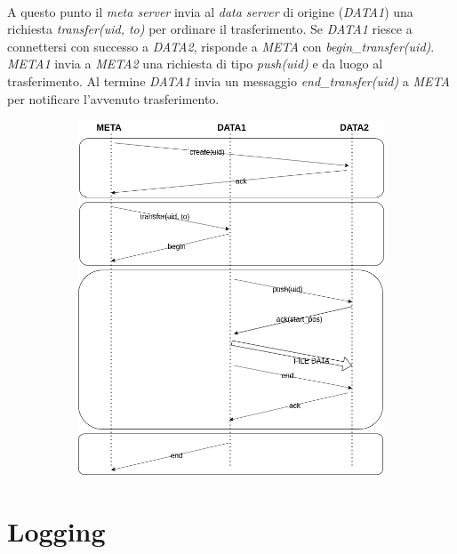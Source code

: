 \documentclass{article}
\begin{document}
\paragraph{} A questo punto il \emph{meta server} invia al \emph{data server} di origine (\emph{DATA1}) una richiesta \emph{transfer(uid, to)} per ordinare il trasferimento. Se \emph{DATA1} riesce a connettersi con successo a \emph{DATA2}, risponde a \emph{META} con \emph{begin\_transfer(uid)}. \emph{META1} invia a \emph{META2} una richiesta di tipo \emph{push(uid)} e da luogo al trasferimento. Al termine \emph{DATA1} invia un messaggio \emph{end\_transfer(uid)} a \emph{META} per notificare l'avvenuto trasferimento.


\begin{figure}[H]
	\centering
	\begin{subfigure}{0.80\linewidth}
		\includegraphics[width=\linewidth]{../diagrams/requests/transfer_request.png}
	\end{subfigure}
\end{figure}




\section{Logging}
\end{document}
